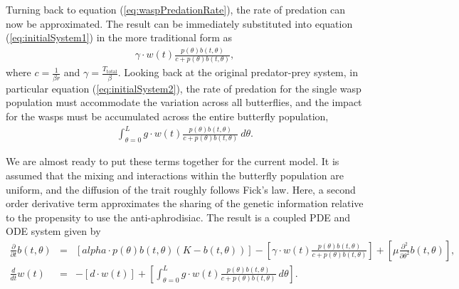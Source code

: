 \documentclass[review,authoryear]{elsarticle}
\def\alpha{alpha}%
\newcommand{\origB}{{b}}
\newcommand{\origW}{{w}}
\newcommand{\origAlpha}{{\alpha}}
\newcommand{\origK}{{K}}
\newcommand{\origGamma}{{\gamma}}
\newcommand{\origC}{{c}}
\newcommand{\origD}{{d}}
\newcommand{\origG}{{g}}
\newcommand{\origL}{{L}}
\newcommand{\origP}[1]{{p}(#1)}
\newcommand{\origTheta}{{\theta}}
\newcommand{\origT}{{t}}
\newcommand{\origMu}{{\mu}}
\begin{document}
Turning back to equation (\ref{eq:waspPredationRate}), the rate of
predation can now be approximated.  The result can be immediately
substituted into equation (\ref{eq:initialSystem1}) in the more
traditional form as
\begin{eqnarray}
  \label{eq:butterflyPredationRate}
  \origGamma \cdot w(\origT) \frac{\origP{\origTheta} \origB(\origT,\origTheta) }{\origC +  \origP{\origTheta} \origB(\origT,\origTheta)},
\end{eqnarray}
where $\origC=\frac{1}{\beta r}$ and
$\origGamma=\frac{T_{\mathrm{total}}}{\beta}$.  Looking back at the
original predator-prey system, in particular equation
(\ref{eq:initialSystem2}), the rate of predation for the single wasp
population must accommodate the variation across all butterflies, and
the impact for the wasps must be accumulated across the entire
butterfly population,
\begin{eqnarray}
  \label{eq:totalWaspPredationRate}
  \int^{\origL}_{\origTheta=0} \origG \cdot \origW(\origT) \frac{\origP{\origTheta} \origB(\origT,\origTheta) }{\origC + \origP{\origTheta} \origB(\origT,\origTheta)} ~ d\origTheta.
\end{eqnarray}

We are almost ready to put these terms together for the current
model. It is assumed that the mixing and interactions within the
butterfly population are uniform, and the diffusion of the trait
roughly follows Fick's law\citep{logan2006applied}. Here, a second
order derivative term approximates the sharing of the genetic
information relative to the propensity to use the
anti-aphrodisiac. The result is a coupled PDE and ODE system given by
\begin{eqnarray}
  \label{eq:odePDE1}
  \frac{\partial}{\partial \origT} \origB(\origT,\origTheta) & = &
      \left[ \origAlpha \cdot \origP{\origTheta} \origB(\origT,\origTheta) (\origK - \origB(\origT,\origTheta)) \right]
      - \left[ \origGamma \cdot \origW(\origT) \frac{\origP{\origTheta} \origB(\origT,\origTheta)}{\origC+\origP{\origTheta}\origB(\origT,\origTheta)} \right]
      + \left[ \origMu \frac{\partial^2}{\partial \origTheta^2} \origB(\origT,\origTheta)\right], \\
  \label{eq:odePDE2}
  \frac{d}{d\origT} \origW(\origT) & = & - \left[ \origD \cdot \origW(\origT) \right]  +
       \left[
          \int^{\origL}_{\origTheta=0} \origG \cdot \origW(\origT) \frac{\origP{\origTheta} \origB(\origT,\origTheta) }{\origC + \origP{\origTheta} \origB(\origT,\origTheta)} ~ d\origTheta
       \right].
\end{eqnarray}
\end{document}
